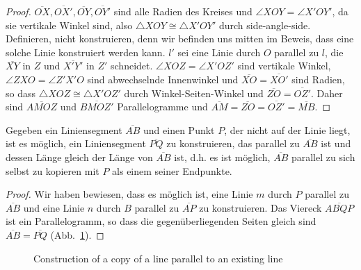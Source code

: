 \begin{proof}
$\overline{OX}, \overline{OX'}, \overline{OY}, \overline{OY'}$ sind alle Radien des Kreises und $\angle XOY = \angle X'OY'$, da sie vertikale Winkel sind, also $\triangle XOY\cong\triangle X'OY'$ durch side-angle-side. Definieren, nicht konstruieren, denn wir befinden uns mitten im Beweis, dass eine solche Linie konstruiert werden kann. $l'$ sei eine Linie durch $O$ parallel zu $l$, die $\overline{XY}$ in $Z$ und $\overline{X'Y'}$ in $Z'$ schneidet. $\angle XOZ=\angle X'OZ'$ sind vertikale Winkel, $\angle ZXO=\angle Z'X'O$ sind abwechselnde Innenwinkel und $\overline{XO}=\overline{XO'}$ sind Radien, so dass $\triangle XOZ\cong\triangle X'OZ'$ durch Winkel-Seiten-Winkel und $\overline{ZO}=\overline{OZ'}$. Daher sind $\overline{AMOZ}$ und $\overline{BMOZ'}$ Parallelogramme und $\overline{AM}=\overline{ZO}=\overline{OZ'}=\overline{MB}$.
\end{proof}

\begin{theorem}\label{thm.parallel-equal}
Gegeben ein Liniensegment $\overline{AB}$ und einen Punkt $P$, der nicht auf der Linie liegt, ist es möglich, ein Liniensegment $\overline{PQ}$ zu konstruieren, das parallel zu $\overline{AB}$ ist und dessen Länge gleich der Länge von $\overline{AB}$ ist, d.h. es ist möglich, $\overline{AB}$ parallel zu sich selbst zu kopieren mit $P$ als einem seiner Endpunkte.
\end{theorem}

\begin{proof}
Wir haben bewiesen, dass es möglich ist, eine Linie $m$ durch $P$ parallel zu $\overline{AB}$ und eine Linie $n$ durch $B$ parallel zu $\overline{AP}$ zu konstruieren. Das Viereck $\overline{ABQP}$ ist ein Parallelogramm, so dass die gegenüberliegenden Seiten gleich sind $\overline{AB}=\overline{PQ}$ (Abb.~\ref{f.se-parallel-other4}).
\end{proof}

\begin{figure}[t]
\begin{center}
\end{center}
\caption{Construction of  a copy of a line parallel to an existing line}\label{f.se-parallel-other4}
\end{figure}

